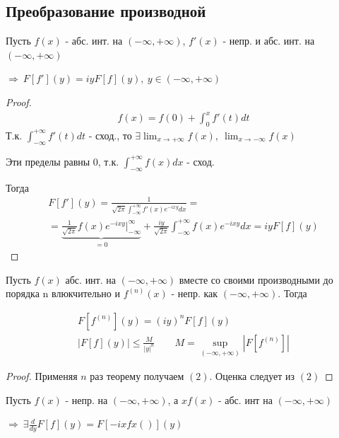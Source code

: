 \documentclass{article}
\theoremstyle{definition}
\numberwithin{theorem}{section}
\numberwithin{lemma}{section}
\numberwithin{definition}{section}
\numberwithin{corollary}{section}
\numberwithin{equation}{section}
\let\implies\Rightarrow
\begin{document}
\subsection{Преобразование производной}
\begin{theorem}
  Пусть $f(x)$ - абс. инт. на $(-\infty,+\infty)$, $f'(x)$ - непр. и абс. инт. на $(-\infty,+\infty)$

  $\implies \ F[f'](y)=iyF[f](y), \ y \in (-\infty,+\infty)$
\end{theorem}
\begin{proof}
  \begin{gather*}
    f(x)=f(0)+\int_{0}^{x}f'(t)dt
  \end{gather*}
  Т.к. $\int_{-\infty}^{+\infty}f'(t)dt$ - сход., то $\exists \lim_{x\to +\infty}f(x),\ \lim_{x\to -\infty}f(x)$

  Эти пределы равны $0$, т.к. $\int_{-\infty}^{+\infty}f(x)dx$ - сход.

  Тогда
  \begin{gather*}
    F[f'](y)=\frac{1}{\sqrt{2\pi}\int_{-\infty}^{+\infty}f'(x)e^{-ixy}dx}= \\ 
    = \underbrace{\frac{1}{\sqrt{2\pi}}f(x)e^{-ixy}\big|_{-\infty}^{\infty}}_{=0}+\frac{iy}{\sqrt{2\pi}}\int_{-\infty}^{+\infty}f(x)e^{-ixy}dx = iyF[f](y)
  \end{gather*}
\end{proof}
\begin{corollary}
  Пусть $f(x)$ абс. инт. на $(-\infty,+\infty)$ вместе со своими производными до порядка n влюкчительно и
  $f^{(n)}(x)$ - непр. как $(-\infty,+\infty)$. Тогда

  \begin{gather*}
    F[f^{(n)}](y)=(iy)^{n}F[f](y) \tag {2} \\ 
    |F[f](y)| \le \frac{M}{|y|^{n}} \qquad M=\sup_{(-\infty,+\infty)}|F[f^{(n)}]| \tag{3}
  \end{gather*}
\end{corollary}
\begin{proof}
  Применяя $n$ раз теорему получаем $(2)$. Оценка следует из $(2)$
\end{proof}
\begin{theorem}
  \phantom{.}

  Пусть $f(x)$ - непр. на $(-\infty,+\infty)$, а $xf(x)$ - абс. инт на $(-\infty,+\infty)$

  $\implies \ \exists \frac{d}{dy}F[f](y)=F[-ixfx()](y)$
\end{theorem}
\end{document}
